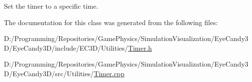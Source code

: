 Set the timer to a specific time. 

The documentation for this class was generated from the following files\+:\begin{DoxyCompactItemize}
\item 
D\+:/\+Programming/\+Repositories/\+Game\+Physics/\+Simulation\+Visualization/\+Eye\+Candy3\+D/\+Eye\+Candy3\+D/include/\+E\+C3\+D/\+Utilities/\mbox{\hyperlink{_timer_8h}{Timer.\+h}}\item 
D\+:/\+Programming/\+Repositories/\+Game\+Physics/\+Simulation\+Visualization/\+Eye\+Candy3\+D/\+Eye\+Candy3\+D/src/\+Utilities/\mbox{\hyperlink{_timer_8cpp}{Timer.\+cpp}}\end{DoxyCompactItemize}

